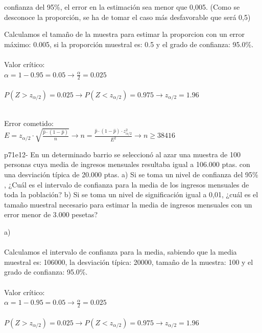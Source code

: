 \documentclass[spanish, 11pt]{exam}
\begin{document}
\begin{questions}
confianza del 95\%, el error en la estimación sea menor que 0,005. (Como se desconoce la proporción, se ha de
tomar el caso más desfavorable que será 0,5) \begin{solution}   Calculamos el tamaño de la muestra para estimar la proporcion con un error máximo: 0.005, si la proporción muestral es: 0.5 y el grado de confianza: 95.0\%. \\ \\ Valor crítico: \\ $\alpha=1-0.95=0.05\to \frac{\alpha}{2}=0.025$ \\ \\ $P(Z>z_{\alpha/2})=0.025\to P(Z<z_{\alpha/2})=0.975 \to z_{\alpha/2} =1.96$ \\ 
     \\
    Error cometido: \\ $E=z_{\alpha / 2}\cdot \sqrt{\frac{\widehat{p}\cdot\left(1-\widehat{p} \right)}{n}} \to n =\frac{\widehat{p}\cdot\left(1-\widehat{p} \right)\cdot z_{\alpha / 2}^2}{E^2} \to n \geq38416$ \\    \end{solution}\question p71e12- En un determinado barrio se seleccionó al azar una muestra de 100 personas cuya media de ingresos
mensuales resultaba igual a 106.000 ptas. con una desviación típica de 20.000 ptas.
a) Si se toma un nivel de confianza del 95\% , ¿Cuál es el intervalo de confianza para la media de los
ingresos mensuales de toda la población?
b) Si se toma un nivel de significación igual a 0,01, ¿cuál es el tamaño muestral necesario para estimar
la media de ingresos mensuales con un error menor de 3.000 pesetas? \begin{solution}   a) \\  \\Calculamos el intervalo de confianza para la media, sabiendo que la media muestral es: 106000, la desviación típica: 20000, tamaño de la muestra: 100 y el grado de confianza: 95.0\%. \\ \\ Valor crítico: \\ $\alpha=1-0.95=0.05\to \frac{\alpha}{2}=0.025$ \\ \\ $P(Z>z_{\alpha/2})=0.025\to P(Z<z_{\alpha/2})=0.975 \to z_{\alpha/2} =1.96$ \\ 

\end{solution}
\end{questions}
\end{document}
